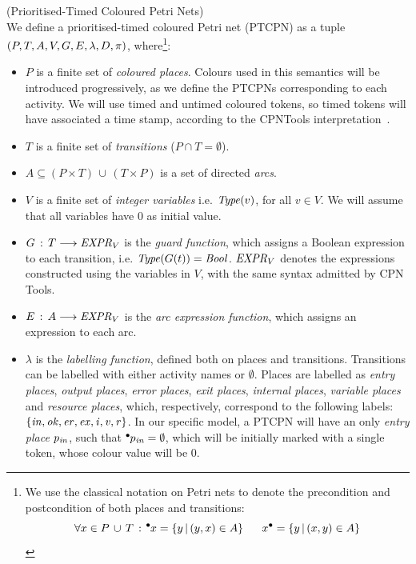 \begin{definition} (Prioritised-Timed Coloured Petri Nets)\\
We define a prioritised-timed coloured Petri net (PTCPN)
as a tuple  
$(P,T,A,V, \linebreak G,E,\lambda,D,\pi)$, where\footnote{
We use the classical notation on Petri nets to denote the
precondition and postcondition of both places and transitions:
%
\[ \forall x \in P\,\cup\,T\,:\,
\hspace*{-0.4em}~^{\bullet} \hspace*{-0.05em}x = \{ y \,|\, (y,x) \in A\}~~~~~
   x^{\bullet} = \{ y \,|\, (x,y) \in A\}
\]
}:
%
\begin{itemize}
\item $P$ is a finite set of {\em coloured places}.
Colours used in this semantics will be introduced progressively,
as we define the PTCPNs corresponding to each activity. 
We will use timed and untimed coloured tokens, so timed tokens will 
have associated a time stamp, according to the CPNTools
interpretation~\cite{Jensen2009}. 
%
\item $T$ is a finite set of {\em transitions} ($P\cap T = \emptyset$).
%
\item $A \subseteq (P\times T)\,\cup\,(T \times P)$ is a
set of directed {\em arcs}.
%
%
\item $V$ is a finite set of {\em integer variables}
i.e. ${\it Type}(v)$, for all $v \in V$.
We will assume that all variables have $0$ as initial value.
%
%
\item $G\,:\, T \longrightarrow {\it EXPR}_V$ is the
{\em guard function}, which assigns a Boolean
expression to each transition, i.e. ${\it Type}(G(t))={\it Bool}$.
${\it EXPR}_V$ denotes the
expressions constructed using the variables in $V$,
with the same syntax admitted by CPN Tools.
%
\item $E\,:\, A \longrightarrow {\it EXPR}_V$ is the
{\em arc expression function}, which assigns an expression
to each arc.
%
\item $\lambda$ is the {\em labelling function}, defined
both on places and transitions.
%
Transitions can be labelled with either activity names
or $\emptyset$. 
%
Places are labelled as
{\em entry places}, {\em output places}, {\em error places}, {\em exit places}, 
{\em internal places}, {\em variable places} and
{\em resource places},
which, respectively, correspond to the following labels:
$\{{\it in, ok, er, ex, i, v, r}\}$. In our specific model, a 
PTCPN will have an only {\em entry place} $p_{\it in}$, 
such that $\hspace*{-0.4em}~^{\bullet} \hspace*{-0.05em}p_{\it in} = \emptyset$,
which will be
initially marked with a single token, whose colour value will be $0$.

\end{itemize}
\end{definition}
